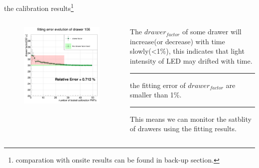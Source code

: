 \documentclass[11pt,compress,xcolor=x11names,UTF8]{beamer}
\begin{document}
\begin{frame}{the calibration results\footnote{comparation with onsite results can be found in back-up section.}}
\begin{columns}
\begin{column}{.5\textwidth}
\begin{figure}
\centering
\includegraphics[width=\textwidth]{lt106} %
\end{figure}
\end{column}
\begin{column}{.45\textwidth}
The $drawer_{factor}$ of some drawer will increase(or decrease) with time slowly(<1\%), this indicates that light intensity of LED may drifted with time. 

\vspace{.5cm}
\hrule{\textwidth}
\vspace{.5cm}

\alert{the fitting error of $drawer_{factor}$ are smaller than 1\%.}

\vspace{.5cm}
\hrule{\textwidth}
\vspace{.5cm}

This means we can monitor the satblity of drawers using the fitting results.

\end{column}
\end{columns}
\end{frame}
\end{document}
